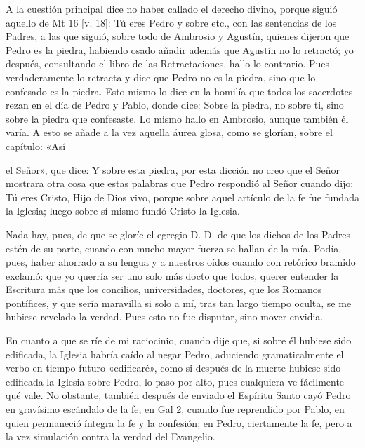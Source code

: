 A la cuestión principal dice no haber callado el derecho divino, porque siguió aquello de Mt 16 [v. 18]: Tú eres Pedro y sobre etc., con las sentencias de los Padres, a las que siguió, sobre todo de Ambrosio y Agustín, quienes dijeron que Pedro es la piedra, habiendo osado añadir además que Agustín no lo retractó; yo después, consultando el libro de las Retractaciones, hallo lo contrario. Pues verdaderamente lo retracta y dice que Pedro no es la piedra, sino que lo confesado es la piedra. Esto mismo lo dice en la homilía que todos los sacerdotes rezan en el día de Pedro y Pablo, donde dice: Sobre la piedra, no sobre ti, sino sobre la piedra que confesaste. Lo mismo hallo en Ambrosio, aunque también él varía. A esto se añade a la vez aquella áurea glosa, como se glorían, sobre el capítulo: «Así

el Señor», que dice: Y sobre esta piedra, por esta dicción no creo que el Señor mostrara otra cosa que estas palabras que Pedro respondió al Señor cuando dijo: Tú eres Cristo, Hijo de Dios vivo, porque sobre aquel artículo de la fe fue fundada la Iglesia; luego sobre sí mismo fundó Cristo la Iglesia.

Nada hay, pues, de que se gloríe el egregio D. D. de que los dichos de los Padres estén de su parte, cuando con mucho mayor fuerza se hallan de la mía. Podía, pues, haber ahorrado a su lengua y a nuestros oídos cuando con retórico bramido exclamó: que yo querría ser uno solo más docto que todos, querer entender la Escritura más que los concilios, universidades, doctores, que los Romanos pontífices, y que sería maravilla si solo a mí, tras tan largo tiempo oculta, se me hubiese revelado la verdad. Pues esto no fue disputar, sino mover envidia.

En cuanto a que se ríe de mi raciocinio, cuando dije que, si sobre él hubiese sido edificada, la Iglesia habría caído al negar Pedro, aduciendo gramaticalmente el verbo en tiempo futuro «edificaré», como si después de la muerte hubiese sido edificada la Iglesia sobre Pedro, lo paso por alto, pues cualquiera ve fácilmente qué vale. No obstante, también después de enviado el Espíritu Santo cayó Pedro en gravísimo escándalo de la fe, en Gal 2, cuando fue reprendido por Pablo, en quien permaneció íntegra la fe y la confesión; en Pedro, ciertamente la fe, pero a la vez simulación contra la verdad del Evangelio.

